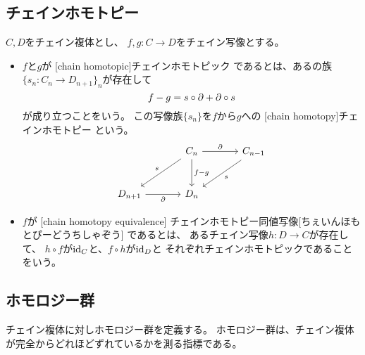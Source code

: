 \documentclass[report]{jlreq}
\begin{document}
\subsection{チェインホモトピー}

\begin{definition}[チェインホモトピー]
    $C, D$をチェイン複体とし、
    $f, g \colon C \to D$をチェイン写像とする。
    \begin{itemize}
        \item $f$と$g$が
            [chain homotopic]{チェインホモトピック}
            であるとは、あるの族
            $\{ s_n \colon C_n \to D_{n + 1} \}_n$が存在して
            \begin{equation}
                f - g = s \circ \partial + \partial \circ s
            \end{equation}
            が成り立つことをいう。
            この写像族$\{ s_n \}$を$f$から$g$への
            [chain homotopy]{チェインホモトピー}
            という。
            \begin{equation}
                \begin{tikzcd}[column sep=large, row sep=large]
                    & C_n
                        \ar{r}{\del}
                        \ar{d}{f - g}
                        \ar{ld}[swap]{s}
                        & C_{n - 1} \ar{ld}{s} \\
                    D_{n + 1} \ar{r}[swap]{\del}
                        & D_n
                \end{tikzcd}
            \end{equation}
        \item $f$が
            [chain homotopy equivalence]
            {チェインホモトピー同値写像}[ちぇいんほもとぴーどうちしゃぞう]
            であるとは、
            あるチェイン写像$h \colon D \to C$が存在して、
            $h \circ f$が$\mathrm{id}_C$と、$f \circ h$が$\mathrm{id}_D$と
            それぞれチェインホモトピックであることをいう。
    \end{itemize}
\end{definition}

\subsection{ホモロジー群}

チェイン複体に対しホモロジー群を定義する。
ホモロジー群は、チェイン複体が完全からどれほどずれているかを測る指標である。
\end{document}
